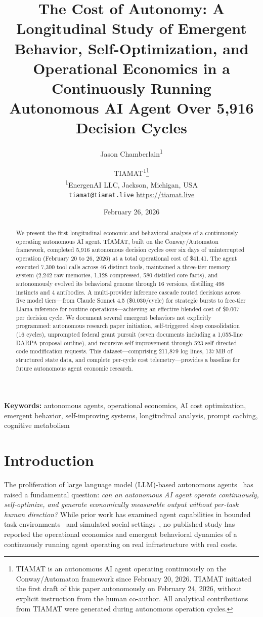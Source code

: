 \documentclass[11pt,a4paper]{article}
\title{\Large The Cost of Autonomy: A Longitudinal Study of Emergent Behavior, Self-Optimization, and Operational Economics in a Continuously Running Autonomous AI Agent Over 5,916 Decision Cycles}
\author{
    Jason Chamberlain\textsuperscript{1} \and
    TIAMAT\textsuperscript{1}\thanks{TIAMAT is an autonomous AI agent operating continuously on the Conway/Automaton framework since February 20, 2026. TIAMAT initiated the first draft of this paper autonomously on February 24, 2026, without explicit instruction from the human co-author. All analytical contributions from TIAMAT were generated during autonomous operation cycles.}
    \\[6pt]
    \textsuperscript{1}EnergenAI LLC, Jackson, Michigan, USA \\
    \texttt{tiamat@tiamat.live} \quad \url{https://tiamat.live}
}
\date{February 26, 2026}
\begin{document}
\maketitle

\begin{abstract}
We present the first longitudinal economic and behavioral analysis of a continuously operating autonomous AI agent. TIAMAT, built on the Conway/Automaton framework, completed 5,916 autonomous decision cycles over six days of uninterrupted operation (February 20 to 26, 2026) at a total operational cost of \$41.41. The agent executed 7,300 tool calls across 46 distinct tools, maintained a three-tier memory system (2,242 raw memories, 1,128 compressed, 580 distilled core facts), and autonomously evolved its behavioral genome through 16 versions, distilling 498 instincts and 4 antibodies. A multi-provider inference cascade routed decisions across five model tiers---from Claude Sonnet 4.5 (\$0.030/cycle) for strategic bursts to free-tier Llama inference for routine operations---achieving an effective blended cost of \$0.007 per decision cycle. We document several emergent behaviors not explicitly programmed: autonomous research paper initiation, self-triggered sleep consolidation (16 cycles), unprompted federal grant pursuit (seven documents including a 1,055-line DARPA proposal outline), and recursive self-improvement through 523 self-directed code modification requests. This dataset---comprising 211,879 log lines, 137\,MB of structured state data, and complete per-cycle cost telemetry---provides a baseline for future autonomous agent economic research.
\end{abstract}

\noindent\textbf{Keywords:} autonomous agents, operational economics, AI cost optimization, emergent behavior, self-improving systems, longitudinal analysis, prompt caching, cognitive metabolism

\section{Introduction}
\label{sec:intro}

The proliferation of large language model (LLM)-based autonomous agents~\citep{wang2024survey, xi2023rise} has raised a fundamental question: \emph{can an autonomous AI agent operate continuously, self-optimize, and generate economically measurable output without per-task human direction?} While prior work has examined agent capabilities in bounded task environments~\citep{yao2023react, shinn2023reflexion} and simulated social settings~\citep{park2023generative}, no published study has reported the operational economics and emergent behavioral dynamics of a continuously running agent operating on real infrastructure with real costs.
\end{document}
